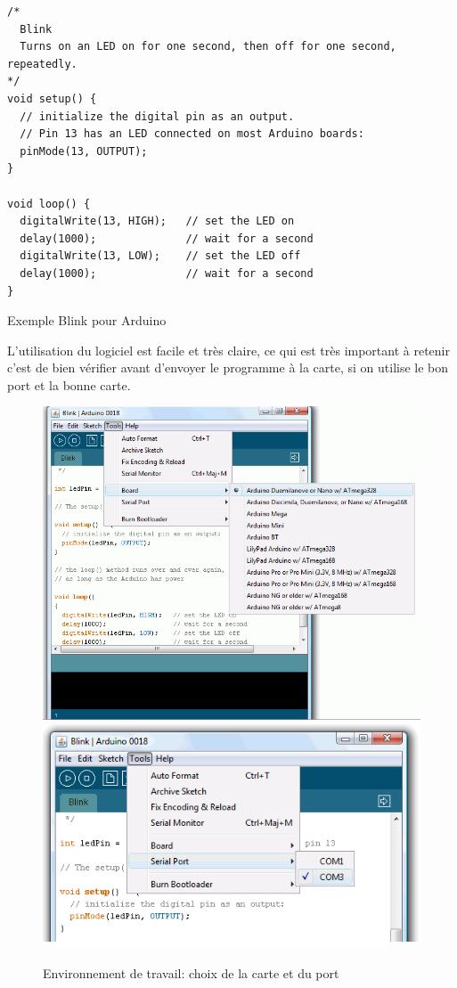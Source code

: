 \begin{table}[h]
\begin{lstlisting}
/*
  Blink
  Turns on an LED on for one second, then off for one second, repeatedly.
*/
void setup() {
  // initialize the digital pin as an output.
  // Pin 13 has an LED connected on most Arduino boards:
  pinMode(13, OUTPUT);
}

void loop() {
  digitalWrite(13, HIGH);   // set the LED on
  delay(1000);              // wait for a second
  digitalWrite(13, LOW);    // set the LED off
  delay(1000);              // wait for a second
}
\end{lstlisting}
\caption{Exemple Blink pour Arduino}
\end{table}

L'utilisation du logiciel est facile et très claire, ce qui est très important à retenir c'est de bien vérifier avant d'envoyer le programme à la carte,
si on utilise le bon port et la bonne carte.

\begin{figure}[h]
\begin{center}
 \includegraphics[scale=0.3]{../images/Arduino/logiciel.png}
\includegraphics[scale=0.5]{../images/Arduino/logiciel1.png}
\caption{Environnement de travail: choix de la carte et du port}
\end{center}
\end{figure}
